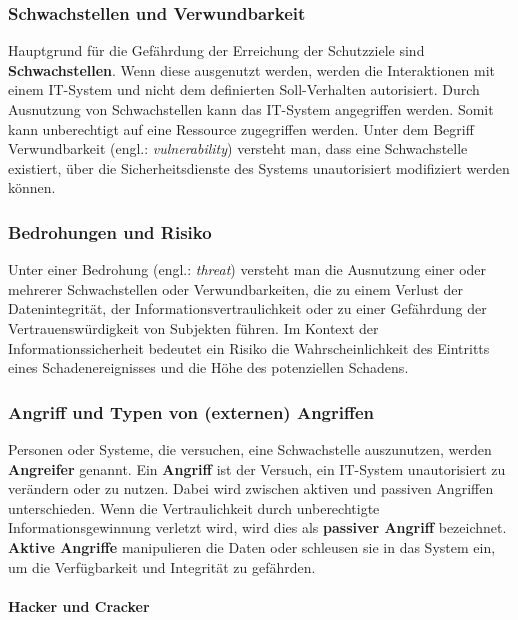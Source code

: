 \subsubsection{Schwachstellen und Verwundbarkeit}

Hauptgrund für die Gefährdung der Erreichung der Schutzziele sind \textbf{Schwachstellen}. Wenn diese ausgenutzt werden, werden die Interaktionen mit einem IT-System und nicht dem definierten Soll-Verhalten autorisiert. Durch Ausnutzung von Schwachstellen kann das IT-System angegriffen werden. Somit kann unberechtigt auf eine Ressource zugegriffen werden\cite[19--20]{nowey2011einleitung}. Unter dem Begriff Verwundbarkeit (engl.: \textit{vulnerability}) versteht man, dass eine Schwachstelle existiert, über die Sicherheitsdienste des Systems unautorisiert modifiziert werden können\cite[38]{eckert2013sicherheit}.

\subsubsection{Bedrohungen und Risiko}

Unter einer Bedrohung (engl.: \textit{threat}) versteht man die Ausnutzung einer oder mehrerer Schwachstellen oder Verwundbarkeiten, die zu einem Verlust der Datenintegrität, der Informationsvertraulichkeit oder zu einer Gefährdung der Vertrauenswürdigkeit von Subjekten führen\cite[39]{eckert2013sicherheit}. Im Kontext der Informationssicherheit bedeutet ein Risiko die Wahrscheinlichkeit des Eintritts eines Schadenereignisses und die Höhe des potenziellen Schadens\cite[15]{nowey2011einleitung}.

\subsubsection{Angriff und Typen von (externen) Angriffen}

Personen oder Systeme, die versuchen, eine Schwachstelle auszunutzen, werden \textbf{Angreifer} genannt. Ein \textbf{Angriff} ist der Versuch, ein IT-System unautorisiert zu verändern oder zu nutzen. Dabei wird zwischen aktiven und passiven Angriffen unterschieden. Wenn die Vertraulichkeit durch unberechtigte Informationsgewinnung verletzt wird, wird dies als \textbf{passiver Angriff} bezeichnet. \textbf{Aktive Angriffe} manipulieren die Daten oder schleusen sie in das System ein, um die Verfügbarkeit und Integrität zu gefährden\cite[20]{nowey2011einleitung}.

\paragraph{Hacker und Cracker}\mbox{}\\

